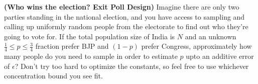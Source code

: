 \documentclass[solution,addpoints,12pt]{exam}
\begin{document}
\begin{questions}

\question[15] \textbf{(Who wins the election? Exit Poll Design)} Imagine there are only two parties standing in the national election, and you have access to sampling and calling up uniformly random people from the electorate to find out who they're going to vote for. If the total population size of India is $N$ and an unknown $\frac14 \leq p \leq \frac34$ fraction prefer BJP and $(1-p)$ prefer Congress, approximately how many people do you need to sample in order to estimate $p$ upto an additive error of $\epsilon$? Don't try too hard to optimize the constants, so feel free to use whichever concentration bound you see fit.

\end{questions}
\end{document}
